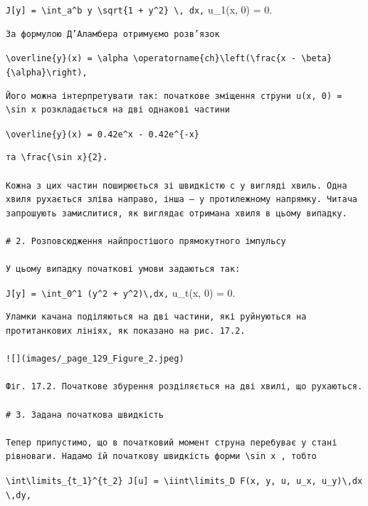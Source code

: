 \documentclass[
  ukrainian,
]{article}
\begin{document}
\texttt{J{[}y{]}\ =\ \textbackslash{}int\_a\^{}b\ y\ \textbackslash{}sqrt\{1\ +\ y\textquotesingle{}\^{}2\}\ \textbackslash{},\ dx,}
u\_1(x, 0) = 0.

\begin{verbatim}
За формулою Д’Аламбера отримуємо розв’язок
\end{verbatim}

\texttt{\textbackslash{}overline\{y\}(x)\ =\ \textbackslash{}alpha\ \textbackslash{}operatorname\{ch\}\textbackslash{}left(\textbackslash{}frac\{x\ -\ \textbackslash{}beta\}\{\textbackslash{}alpha\}\textbackslash{}right),}

\begin{verbatim}
Його можна інтерпретувати так: початкове зміщення струни u(x, 0) = \sin x розкладається на дві однакові частини
\end{verbatim}

\texttt{\textbackslash{}overline\{y\}(x)\ =\ 0.42e\^{}x\ -\ 0.42e\^{}\{-x\}}

\begin{verbatim}
та \frac{\sin x}{2}.

Кожна з цих частин поширюється зі швидкістю c у вигляді хвиль. Одна хвиля рухається зліва направо, інша — у протилежному напрямку. Читача запрошують замислитися, як виглядає отримана хвиля в цьому випадку.

# 2. Розповсюдження найпростішого прямокутного імпульсу

У цьому випадку початкові умови задаються так:
\end{verbatim}

\texttt{J{[}y{]}\ =\ \textbackslash{}int\_0\^{}1\ (y\^{}2\ +\ y\textquotesingle{}\^{}2)\textbackslash{},dx,}
u\_t(x, 0) = 0.

\begin{verbatim}
Уламки качана поділяються на дві частини, які руйнуються на протитанкових лініях, як показано на рис. 17.2.

![](images/_page_129_Figure_2.jpeg)

Фіг. 17.2. Початкове збурення розділяється на дві хвилі, що рухаються.

# 3. Задана початкова швидкість

Тепер припустимо, що в початковий момент струна перебуває у стані рівноваги. Надамо їй початкову швидкість форми \sin x , тобто
\end{verbatim}

\texttt{\textbackslash{}int\textbackslash{}limits\_\{t\_1\}\^{}\{t\_2\}\ J{[}u{]}\ =\ \textbackslash{}iint\textbackslash{}limits\_D\ F(x,\ y,\ u,\ u\_x,\ u\_y)\textbackslash{},dx\textbackslash{},dy,}
\end{document}
